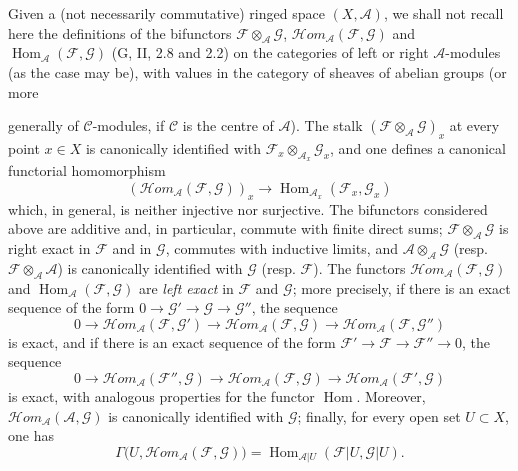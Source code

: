 \begin{env}[4.1.5]
\label{0.4.1.5}
Given a (not necessarily commutative) ringed space $(X,\mathcal{A})$,
we shall not recall here the definitions of the bifunctors
$\mathcal{F}\otimes_{\mathcal{A}}\mathcal{G}$,
$\mathcal{H}\!om_{\mathcal{A}}(\mathcal{F},\mathcal{G})$ and
$\operatorname{Hom}_{\mathcal{A}}(\mathcal{F},\mathcal{G})$
(G, II, 2.8 and 2.2) on the categories of left or
right $\mathcal{A}$-modules (as the case may be), with values in the category of sheaves
of abelian groups (or more

generally of $\mathcal{C}$-modules, if $\mathcal{C}$ is the centre of
$\mathcal{A}$). The stalk
$(\mathcal{F}\otimes_{\mathcal{A}}\mathcal{G})_x$ at every point $x\in X$
is canonically identified with
$\mathcal{F}_x\otimes_{\mathcal{A}_x}\mathcal{G}_x$, and one defines a
canonical functorial homomorphism
\[
  (\mathcal{H}\!om_{\mathcal{A}}(\mathcal{F},\mathcal{G}))_x
  \longrightarrow
  \operatorname{Hom}_{\mathcal{A}_x}(\mathcal{F}_x,\mathcal{G}_x)
\]
which, in general, is neither injective nor surjective. The bifunctors considered
above are additive and, in particular, commute with finite direct
sums; $\mathcal{F}\otimes_{\mathcal{A}}\mathcal{G}$ is right exact in
$\mathcal{F}$ and in $\mathcal{G}$, commutes with inductive limits, and
$\mathcal{A}\otimes_{\mathcal{A}}\mathcal{G}$
(resp. $\mathcal{F}\otimes_{\mathcal{A}}\mathcal{A}$) is
canonically identified with $\mathcal{G}$ (resp. $\mathcal{F}$). The functors
$\mathcal{H}\!om_{\mathcal{A}}(\mathcal{F},\mathcal{G})$ and
$\operatorname{Hom}_{\mathcal{A}}(\mathcal{F},\mathcal{G})$ are
\emph{left exact} in $\mathcal{F}$ and $\mathcal{G}$; more precisely,
if there is an exact sequence of the form
$0\to\mathcal{G}'\to\mathcal{G}\to\mathcal{G}''$, the sequence
\[
  0\longrightarrow
  \mathcal{H}\!om_{\mathcal{A}}(\mathcal{F},\mathcal{G}')
  \longrightarrow
  \mathcal{H}\!om_{\mathcal{A}}(\mathcal{F},\mathcal{G})
  \longrightarrow
  \mathcal{H}\!om_{\mathcal{A}}(\mathcal{F},\mathcal{G}'')
\]
is exact, and if there is an exact sequence of the form
$\mathcal{F}'\to\mathcal{F}\to\mathcal{F}''\to0$, the sequence
\[
  0\longrightarrow
  \mathcal{H}\!om_{\mathcal{A}}(\mathcal{F}'',\mathcal{G})
  \longrightarrow
  \mathcal{H}\!om_{\mathcal{A}}(\mathcal{F},\mathcal{G})
  \longrightarrow
  \mathcal{H}\!om_{\mathcal{A}}(\mathcal{F}',\mathcal{G})
\]
is exact, with analogous properties for the functor
$\operatorname{Hom}$. Moreover,
$\mathcal{H}\!om_{\mathcal{A}}(\mathcal{A},\mathcal{G})$ is
canonically identified with $\mathcal{G}$; finally, for every open set $U\subset X$, one has
\[
  \Gamma\bigl(U,\mathcal{H}\!om_{\mathcal{A}}(\mathcal{F},\mathcal{G})\bigr)
  =
  \operatorname{Hom}_{\mathcal{A}|U}(\mathcal{F}|U,\mathcal{G}|U).
\]


\end{env}
